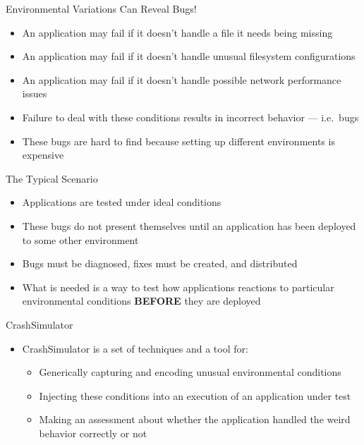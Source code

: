 \documentclass[pdf]{beamer}
\begin{document}
\begin{frame}{Environmental Variations Can Reveal Bugs!}
  \begin{itemize}
  \item{An application may fail if it doesn't handle a file it needs being missing}
  \item{An application may fail if it doesn't handle unusual filesystem configurations}
  \item{An application may fail if it doesn't handle possible network
      performance issues}
  \item{Failure to deal with these conditions results in incorrect behavior ---
      i.e.\ bugs}
  \item{These bugs are hard to find because setting up different environments is
      expensive}
  \end{itemize}
\end{frame}


\begin{frame}{The Typical Scenario}
  \begin{itemize}
  \item{Applications are tested under ideal conditions}
  \item{These bugs do not present themselves until an application has
      been deployed to some other environment}
  \item{Bugs must be diagnosed, fixes must be created, and distributed}
  \item{What is needed is a way to test how applications reactions to particular
      environmental conditions \textbf{BEFORE} they are deployed}
  \end{itemize}
\end{frame}


\begin{frame}{CrashSimulator}
  \begin{itemize}
  \item{CrashSimulator is a set of techniques and a tool for:}
    \begin{itemize}
    \item{Generically capturing and encoding unusual environmental conditions}
    \item{Injecting these conditions into an execution of an application under
        test}
    \item{Making an assessment about whether the application handled the
        weird behavior correctly or not}
    \end{itemize}
  \end{itemize}
\end{frame}
\end{document}
